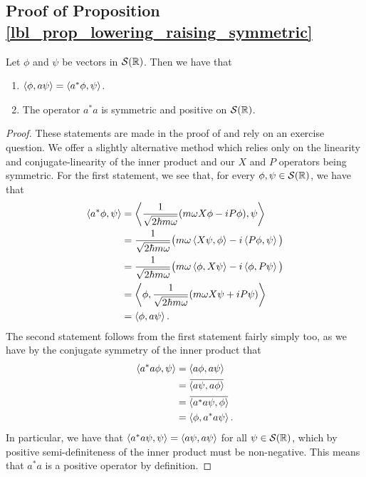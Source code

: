 \subsection{Proof of Proposition \eqref{lbl_prop_lowering_raising_symmetric}}\label{proof_lbl_prop_lowering_raising_symmetric}

\begin{proposition}
  Let $\phi$ and $\psi$ be vectors in $\mathcal{S}(\mathbb{R})$. Then we have that
  \begin{enumerate}[label=(\alph*)]
    \item $\left\langle \phi, a\psi\right\rangle = \left\langle a^* \phi, \psi\right\rangle$.
    \item The operator $a^*a$ is symmetric and positive on $\mathcal{S}(\mathbb{R})$.
  \end{enumerate}
\end{proposition}
\begin{proof}
  These statements are made in the proof of {\cite[Theorem 11.4]{Hall2013}} and rely on an exercise question. We offer a slightly alternative method which relies only on the linearity and conjugate-linearity of the inner product and our $X$ and $P$ operators being symmetric. For the first statement, we see that, for every $\phi, \psi \in \mathcal{S}(\mathbb{R})$, we have that
  \begin{align*}
    \left\langle a^* \phi, \psi\right\rangle
    &=
    \left\langle 
      \frac{1}{\sqrt{2\hbar m \omega}}(m\omega X \phi - iP\phi), \psi
    \right\rangle\\
    &=
    \frac{1}{\sqrt{2\hbar m \omega}} \big(m\omega \left\langle X\psi, \phi\right\rangle  - i \left\langle P\phi, \psi\right\rangle \big) \\
    &=
    \frac{1}{\sqrt{2\hbar m \omega}}
      \big(
        m \omega \left\langle \phi, X\psi\right\rangle - i \left\langle \phi, P\psi\right\rangle
      \big) \\
    &=
    \left\langle \phi, \frac{1}{\sqrt{2\hbar m \omega}}(m\omega X \psi + iP\psi) \right\rangle \\
    &=
    \left\langle \phi, a\psi\right\rangle.
  \end{align*}
  The second statement follows from the first statement fairly simply too, as we have by the conjugate symmetry of the inner product that
  \begin{align*}
    \ip{a^* a \phi, \psi}
    &=
    \ip{a \phi, a \psi} \\
    &=
    \conjugate{ \ip{a \psi, a \phi}  } \\
    &=
    \conjugate{ \ip{a^* a \psi, \phi} } \\
    &=
    \ip{\phi, a^* a \psi}.
  \end{align*}
  In particular, we have that $\left\langle a^*a \psi, \psi\right\rangle = \left\langle a\psi, a\psi\right\rangle$ for all $\psi \in \mathcal{S}(\mathbb{R})$, which by positive semi-definiteness of the inner product must be non-negative. This means that $a^*a$ is a positive operator by definition.
\end{proof}
